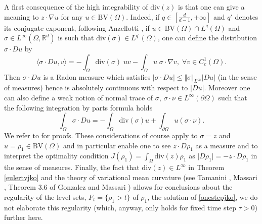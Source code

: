\documentclass[12pt, a4paper]{article}
\numberwithin{equation}{section}
\theoremstyle{plain}
\theoremstyle{definition}
\theoremstyle{remark}
\newcommand{\R}{\mathbb{R}}
\newcommand{\BV}{\mathrm{BV}}
\newcommand{\dive}{\mathrm{div}}
\begin{document}
 


 
 
 

A first consequence of  the high integrability of $\dive(z)$ is that one can give a meaning to $z \cdot \nabla u$ for any $u \in \BV(\Omega)$.  Indeed, if $q\in [\frac{d}{d-1}, +\infty]$ and $q'$ denotes its conjugate exponent,  following Anzellotti \cite{Anzellotti},  if $u\in \BV(\Omega)\cap L^q(\Omega)$ and  $\sigma \in L^{\infty}(\Omega, \R^d)$ is such that $\dive(\sigma) \in L^{q'}(\Omega)$, one can define the distribution $\sigma \cdot Du$ by
\[\langle \sigma \cdot Du,  v \rangle =- \int_{\Omega}  \dive(\sigma) \; u  v  - \int_\Omega u \; \sigma \cdot \nabla  v, \; \forall v\in C_c^1(\Omega).\]
Then $\sigma \cdot Du$ is a Radon measure which satisfies  $\vert \sigma \cdot Du \vert \le \Vert \sigma \Vert_{L^{\infty}} \vert Du \vert$ (in the sense of measures) hence  is absolutely continuous with respect to $\vert D u\vert$.  Moreover one can also define a weak notion of normal trace of $\sigma$, $\sigma \cdot \nu \in L^{\infty}(\partial \Omega)$ such that the following integration by parts formula holds
\[\int_{\Omega} \sigma \cdot Du=-\int_{\Omega} \dive(\sigma) u+ \int_{\partial \Omega} u (\sigma \cdot \nu).\]
We refer to \cite{Anzellotti} for proofs. These considerations of course apply to $\sigma=z$ and $u=\rho_1\in \BV(\Omega)$ and in particular enable one to see $z\cdot D\rho_1$ as a measure and to interpret the optimality condition $J(\rho_1)=\int_{\Omega} \dive(z) \rho_1$ as $\vert D \rho_1 \vert=-z \cdot D \rho_1$ in the sense of measures. Finally, the fact that $\dive(z)\in L^\infty$  in  Theorem \ref{eulertvjko}  and the theory of variational mean curvature (see Tamanini  \cite{tamanini1982boundaries}, Massari  \cite{zbMATH03477953,massari1975frontiere}, Theorem 3.6 of  Gonzalez and Massari \cite{massari1994variational}) allows for conclusions about the regularity of the level sets, $F_t = \{\rho_1>t\}$  of $\rho_1$, the solution of \eqref{onestepjko}, we do not elaborate this regularity (which, anyway, only holds for fixed time step $\tau>0$) further here. 


\end{document}
